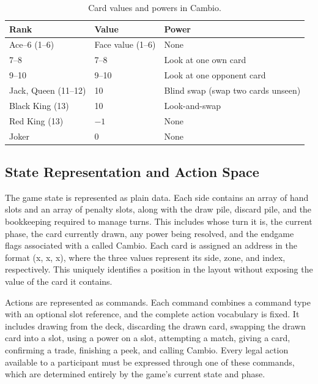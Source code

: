 \documentclass[12pt,a4paper,oneside]{report}
\begin{document}
\begin{table}[h]
\centering
\caption{Card values and powers in Cambio.}
\label{tab:cardvalues}
\begin{tabular}{lll}
\hline
\textbf{Rank} & \textbf{Value} & \textbf{Power} \\
\hline
Ace--6 (1--6)      & Face value (1--6) & None \\
7--8               & 7--8              & Look at one own card \\
9--10              & 9--10             & Look at one opponent card \\
Jack, Queen (11--12) & 10              & Blind swap (swap two cards unseen) \\
Black King (13)    & 10                & Look-and-swap \\
Red King (13)      & $-1$              & None \\
Joker              & 0                 & None \\
\hline
\end{tabular}
\end{table}

\subsection{State Representation and Action Space}

The game state is represented as plain data. Each side contains an array of hand slots and an array of penalty slots, along with the draw pile, discard pile, and the bookkeeping required to manage turns. This includes whose turn it is, the current phase, the card currently drawn, any power being resolved, and the endgame flags associated with a called Cambio. Each card is assigned an address in the format (x, x, x), where the three values represent its side, zone, and index, respectively. This uniquely identifies a position in the layout without exposing the value of the card it contains.

Actions are represented as commands. Each command combines a command type with an optional slot reference, and the complete action vocabulary is fixed. It includes drawing from the deck, discarding the drawn card, swapping the drawn card into a slot, using a power on a slot, attempting a match, giving a card, confirming a trade, finishing a peek, and calling Cambio. Every legal action available to a participant must be expressed through one of these commands, which are determined entirely by the game's current state and phase.
\end{document}
